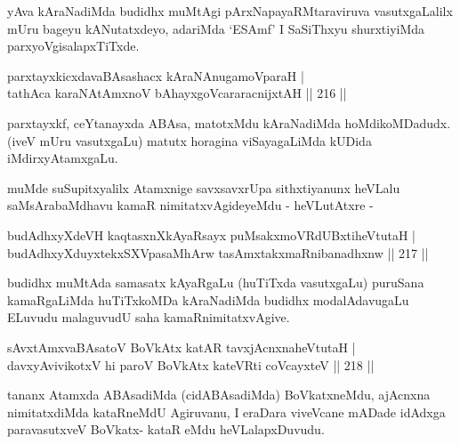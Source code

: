 \begin{artha}
yAva kAraNadiMda budidhx muMtAgi pArxNapayaRMtaraviruva vasutxgaLalilx mUru bageyu kANutatxdeyo, adariMda `ESAmf' I SaSiThxyu shurxtiyiMda parxyoVgisalapxTiTxde.
\end{artha}

\begin{shl}
parxtayxkicxdavaBAsashacx kAraNAnugamoV\s paraH |\\
tathAca karaNAtAmxnoV bAhayxgoVcararacnijxtAH \hfill || 216 ||
\end{shl}

\begin{artha}
parxtayxkf, ceYtanayxda ABAsa, matotxMdu kAraNadiMda hoMdikoMDadudx. (iveV mUru vasutxgaLu) matutx horagina viSayagaLiMda kUDida iMdirxyAtamxgaLu. 
\end{artha}
\begin{artha}
muMde suSupitxyalilx Atamxnige savxsavxrUpa sithxtiyanunx heVLalu saMsArabaMdhavu kamaR nimitatxvAgideyeMdu - heVLutAtxre -
\end{artha}

\begin{shl}
budAdhxyXdeVH kaqtasxnXkAyaRsayx puMsakxmoVRdUBxtiheVtutaH |\\
budAdhxyXduyxtekxSXVpasaMhArw tasAmxtakxmaRnibanadhxnw \hfill || 217 ||
\end{shl}

\begin{artha}
budidhx muMtAda samasatx kAyaRgaLu (huTiTxda vasutxgaLu) puruSana kamaRgaLiMda huTiTxkoMDa kAraNadiMda budidhx modalAdavugaLu ELuvudu malaguvudU saha kamaRnimitatxvAgive.
\end{artha}


\begin{shl}
sAvxtAmxvaBAsatoV BoVkAtx katAR tavxjAcnxnaheVtutaH |\\
davxyAvivikotxV hi paroV BoVkAtx kateVRti coVcayxteV \hfill || 218 ||
\end{shl}

\begin{artha}
tananx Atamxda ABAsadiMda (cidABAsadiMda) BoVkatxneMdu, ajAcnxna 
nimitatxdiMda kataRneMdU Agiruvanu, I eraDara viveVcane mADade idAdxga paravasutxveV BoVkatx- kataR eMdu heVLalapxDuvudu.
\end{artha}


